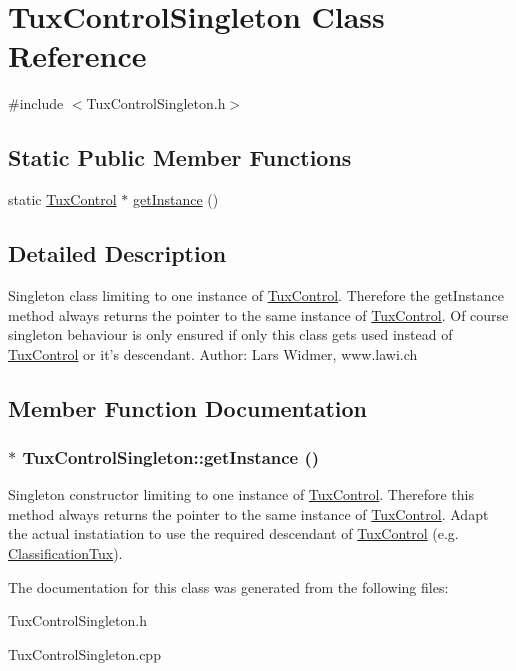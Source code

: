 \hypertarget{classTuxControlSingleton}{
\section{TuxControlSingleton Class Reference}
\label{classTuxControlSingleton}
}


{\ttfamily \#include $<$TuxControlSingleton.h$>$}\subsection*{Static Public Member Functions}
\begin{DoxyCompactItemize}
\item 
static \hyperlink{classTuxControl}{TuxControl} $\ast$ \hyperlink{classTuxControlSingleton_a5a4d9a1b916d18caf86b82f8aa7f4e78}{getInstance} ()
\end{DoxyCompactItemize}


\subsection{Detailed Description}
Singleton class limiting to one instance of \hyperlink{classTuxControl}{TuxControl}. Therefore the getInstance method always returns the pointer to the same instance of \hyperlink{classTuxControl}{TuxControl}. Of course singleton behaviour is only ensured if only this class gets used instead of \hyperlink{classTuxControl}{TuxControl} or it's descendant. Author: Lars Widmer, www.lawi.ch 

\subsection{Member Function Documentation}
\hypertarget{classTuxControlSingleton_a5a4d9a1b916d18caf86b82f8aa7f4e78}{
\subsubsection[{getInstance}]{ $\ast$ TuxControlSingleton::getInstance ()}}
\label{classTuxControlSingleton_a5a4d9a1b916d18caf86b82f8aa7f4e78}
Singleton constructor limiting to one instance of \hyperlink{classTuxControl}{TuxControl}. Therefore this method always returns the pointer to the same instance of \hyperlink{classTuxControl}{TuxControl}. Adapt the actual instatiation to use the required descendant of \hyperlink{classTuxControl}{TuxControl} (e.g. \hyperlink{classClassificationTux}{ClassificationTux}). 

The documentation for this class was generated from the following files:\begin{DoxyCompactItemize}
\item 
TuxControlSingleton.h\item 
TuxControlSingleton.cpp\end{DoxyCompactItemize}
